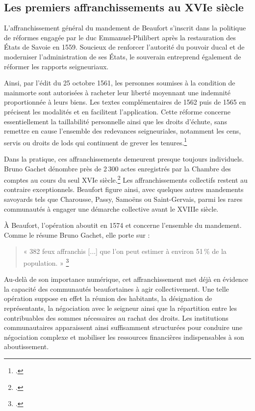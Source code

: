 \documentclass[12pt,a4paper]{report}
\begin{document}
\subsection{Les premiers affranchissements au XVIe siècle}

L'affranchissement général du mandement de Beaufort s'inscrit dans la politique de réformes engagée par le duc Emmanuel-Philibert après la restauration des États de Savoie en 1559. Soucieux de renforcer l'autorité du pouvoir ducal et de moderniser l'administration de ses États, le souverain entreprend également de réformer les rapports seigneuriaux.

Ainsi, par l'édit du 25 octobre 1561, les personnes soumises à la condition de \gls{mainmorte} sont autorisées à racheter leur liberté moyennant une indemnité proportionnée à leurs biens. Les textes complémentaires de 1562 puis de 1565 en précisent les modalités et en facilitent l'application. Cette réforme concerne essentiellement la taillabilité personnelle ainsi que les droits d'\gls{échute}, sans remettre en cause l'ensemble des redevances seigneuriales, notamment les cens, servis ou droits de lods qui continuent de grever les tenures.\footcite{Gachet2022}

Dans la pratique, ces affranchissements demeurent presque toujours individuels. Bruno Gachet dénombre près de 2\,300 actes enregistrés par la Chambre des comptes au cours du seul XVIe siècle.\footcite{Gachet2022} Les affranchissements collectifs restent au contraire exceptionnels. Beaufort figure ainsi, avec quelques autres mandements savoyards tels que Charousse, Passy, Samoëns ou Saint-Gervais, parmi les rares communautés à engager une démarche collective avant le XVIIIe siècle.

À Beaufort, l'opération aboutit en 1574 et concerne l'ensemble du mandement. Comme le résume Bruno Gachet, elle porte sur :

\begin{quote}
	« 382 feux affranchis [...] que l'on peut estimer à environ 51\,\% de la population. »
	\footcite[233]{Gachet2022}
\end{quote}

Au-delà de son importance numérique, cet affranchissement met déjà en évidence la capacité des communautés beaufortaines à agir collectivement. Une telle opération suppose en effet la réunion des habitants, la désignation de représentants, la négociation avec le seigneur ainsi que la répartition entre les contribuables des sommes nécessaires au rachat des droits. Les institutions communautaires apparaissent ainsi suffisamment structurées pour conduire une négociation complexe et mobiliser les ressources financières indispensables à son aboutissement.
\end{document}
